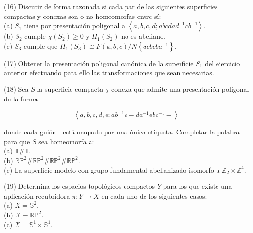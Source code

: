 \documentclass[
  a4paper,
  spanish,
  12pt,
]{scrartcl}
\begin{document}
\begin{ejer}
(16) Discutir de forma razonada si cada par de las siguientes superficies compactas y conexas son o no homeomorfas entre sí:\\
(a) $S_{1}$ tiene por presentación poligonal a $\left\langle a, b, c, d ; a b c d a d^{-1} c b^{-1}\right\rangle$.\\
(b) $S_{2}$ cumple $\chi\left(S_{2}\right) \geq 0$ y $\Pi_{1}\left(S_{2}\right)$ no es abeliano.\\
(c) $S_{3}$ cumple que $\Pi_{1}\left(S_{3}\right) \cong F(a, b, c) / N\left\{a c b c b a^{-1}\right\}$.\\
\end{ejer}

\begin{ejer}
(17) Obtener la presentación poligonal canónica de la superficie $S_{1}$ del ejercicio anterior efectuando para ello las transformaciones que sean necesarias.\\
\end{ejer}

\begin{ejer}
(18) Sea $S$ la superficie compacta y conexa que admite una presentación poligonal de la forma

$$
\left\langle a, b, c, d, e ; a b^{-1} c-d a^{-1} e b c^{-1}-\right\rangle
$$

donde cada guión - está ocupado por una única etiqueta. Completar la palabra para que $S$ sea homeomorfa a:\\
(a) $\mathbb{T} \# \mathbb{T}$.\\
(b) $\mathbb{R} \mathbb{P}^{2} \# \mathbb{R} \mathbb{P}^{2} \# \mathbb{R} \mathbb{P}^{2} \# \mathbb{R} \mathbb{P}^{2}$.\\
(c) La superficie modelo con grupo fundamental abelianizado isomorfo a $\mathbb{Z}_{2} \times \mathbb{Z}^{4}$.\\
\end{ejer}

\begin{ejer}
(19) Determina los espacios topológicos compactos $Y$ para los que existe una aplicación recubridora $\pi: Y \rightarrow X$ en cada uno de los siguientes casos:\\
(a) $X=\mathbb{S}^{2}$.\\
(b) $X=\mathbb{R} \mathbb{P}^{2}$.\\
(c) $X=\mathbb{S}^{1} \times \mathbb{S}^{1}$.
\end{ejer}
\end{document}
